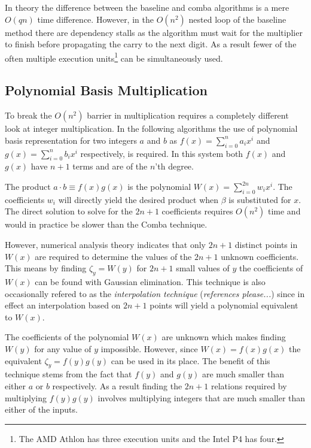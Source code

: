 \documentclass[b5paper]{book}
\begin{document}
In theory the difference between the baseline and comba algorithms is a mere $O(qn)$ time difference.  However, in the $O(n^2)$ nested loop of the
baseline method there are dependency stalls as the algorithm must wait for the multiplier to finish before propagating the carry to the next 
digit.  As a result fewer of the often multiple execution units\footnote{The AMD Athlon has three execution units and the Intel P4 has four.} can
be simultaneously used.  

\subsection{Polynomial Basis Multiplication}
To break the $O(n^2)$ barrier in multiplication requires a completely different look at integer multiplication.  In the following algorithms
the use of polynomial basis representation for two integers $a$ and $b$ as $f(x) = \sum_{i=0}^{n} a_i x^i$ and  
$g(x) = \sum_{i=0}^{n} b_i x^i$ respectively, is required.  In this system both $f(x)$ and $g(x)$ have $n + 1$ terms and are of the $n$'th degree.
 
The product $a \cdot b \equiv f(x)g(x)$ is the polynomial $W(x) = \sum_{i=0}^{2n} w_i x^i$.  The coefficients $w_i$ will
directly yield the desired product when $\beta$ is substituted for $x$.  The direct solution to solve for the $2n + 1$ coefficients
requires $O(n^2)$ time and would in practice be slower than the Comba technique.

However, numerical analysis theory indicates that only $2n + 1$ distinct points in $W(x)$ are required to determine the values of the $2n + 1$ unknown 
coefficients.   This means by finding $\zeta_y = W(y)$ for $2n + 1$ small values of $y$ the coefficients of $W(x)$ can be found with 
Gaussian elimination.  This technique is also occasionally refered to as the \textit{interpolation technique} (\textit{references please...}) since in 
effect an interpolation based on $2n + 1$ points will yield a polynomial equivalent to $W(x)$.  

The coefficients of the polynomial $W(x)$ are unknown which makes finding $W(y)$ for any value of $y$ impossible.  However, since 
$W(x) = f(x)g(x)$ the equivalent $\zeta_y = f(y) g(y)$ can be used in its place.  The benefit of this technique stems from the 
fact that $f(y)$ and $g(y)$ are much smaller than either $a$ or $b$ respectively.  As a result finding the $2n + 1$ relations required 
by multiplying $f(y)g(y)$ involves multiplying integers that are much smaller than either of the inputs.
\end{document}
